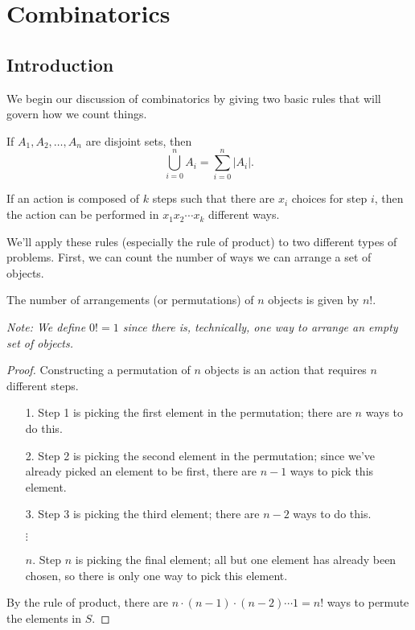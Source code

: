 \documentclass[../m055main.tex]{subfiles}
\begin{document}
\chapter{Combinatorics}

\section{Introduction}
We begin our discussion of combinatorics by giving two basic rules that will govern how we count things.

\begin{theorem}
    If $A_1, A_2, \ldots, A_n$ are disjoint sets, then
    \[ \bigcup_{i=0}^n A_i = \sum_{i=0}^n |A_i|. \]
\end{theorem}

\begin{theorem}
    If an action is composed of $k$ steps such that there are $x_i$ choices for step $i$, then the action can be performed in $x_1 x_2 \cdots x_k$ different ways.
\end{theorem}

We'll apply these rules (especially the rule of product) to two different types of problems.
First, we can count the number of ways we can arrange a set of objects.

\begin{theorem}
    The number of arrangements (or permutations) of $n$ objects is given by $n!$. %

    \medskip
    \textit{Note: We define $0! = 1$ since there is, technically, one way to arrange an empty set of objects.}
\end{theorem}

\begin{proof}
    Constructing a permutation of $n$ objects is an action that requires $n$ different steps.
    \begin{itemize}
        \item [1.] Step 1 is picking the first element in the permutation; there are $n$ ways to do this.
        \item [2.] Step 2 is picking the second element in the permutation; since we've already picked an element to be first, there are $n-1$ ways to pick this element.
        \item [3.] Step 3 is picking the third element; there are $n-2$ ways to do this.
        \item [$\vdots$\phantom{.}]
        \item [$n$.] Step $n$ is picking the final element; all but one element has already been chosen, so there is only one way to pick this element.
    \end{itemize}
    By the rule of product, there are $n \cdot (n-1) \cdot (n-2) \cdots 1 = n!$ ways to permute the elements in $S$.
\end{proof}
\end{document}
